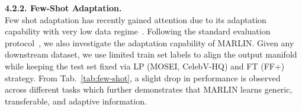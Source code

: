 \documentclass[10pt,twocolumn,letterpaper]{article}
\begin{document}
\noindent \textbf{4.2.2. Few-Shot Adaptation.}\\
Few shot adaptation has recently gained attention due to its adaptation capability with very low data regime~\cite{browatzki3FabRec2020,shuLearning2021,zhuangFewShot2021,zhengGeneral2022}. Following the standard evaluation protocol~\cite{browatzki3FabRec2020,shuLearning2021,zhuangFewShot2021,zhengGeneral2022}, we also investigate the adaptation capability of MARLIN. Given any downstream dataset, we use limited train set labels to align the output manifold while keeping the test set fixed via LP (MOSEI, CelebV-HQ) and FT (FF+) strategy. From Tab.~\ref{tab:few-shot}, a slight drop in performance is observed across different tasks which further demonstrates that MARLIN learns generic, transferable, and adaptive information. 

\begin{table}[b]
\vspace{-4mm}
\caption{Contribution of different modules, encoder architectures, and masking strategies towards overall MARLIN framework. Fasking: Facial Guided Masking, AT: Adversarial Training}
\label{tab:ablation}
\end{table}
\end{document}
